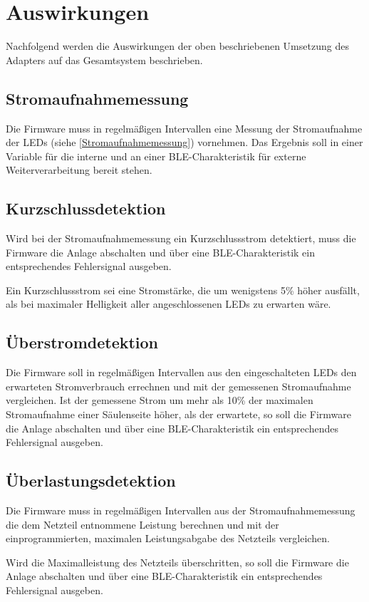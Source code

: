 
\section{Auswirkungen}

Nachfolgend werden die Auswirkungen der oben beschriebenen
Umsetzung des Adapters auf das Gesamtsystem beschrieben.

\subsection{Stromaufnahmemessung}

Die Firmware muss
in regelm\"a{\ss}igen Intervallen
eine Messung der
Stromaufnahme der LEDs
(siehe \ref{Stromaufnahmemessung})
vornehmen.
Das Ergebnis soll in einer Variable
f\"ur die interne
und an einer BLE-Charakteristik f\"ur externe
Weiterverarbeitung bereit stehen.

\subsection{Kurzschlussdetektion}

Wird bei der Stromaufnahmemessung
ein Kurzschlussstrom detektiert,
muss die Firmware die Anlage abschalten
und \"uber eine BLE-Charakteristik
ein entsprechendes Fehlersignal ausgeben.

Ein Kurzschlussstrom sei eine Stromst\"arke,
die um wenigstens 5\% h\"oher ausf\"allt,
als bei maximaler Helligkeit
aller angeschlossenen LEDs
zu erwarten w\"are.

\subsection{\"Uberstromdetektion}

Die Firmware soll
in regelm\"a{\ss}igen Intervallen
aus den eingeschalteten LEDs
den erwarteten Stromverbrauch errechnen
und mit der gemessenen Stromaufnahme vergleichen.
Ist der gemessene Strom
um mehr als 10\% der maximalen Stromaufnahme
einer S\"aulenseite
h\"oher,
als der erwartete,
so soll die Firmware die Anlage abschalten
und \"uber eine BLE-Charakteristik
ein entsprechendes Fehlersignal ausgeben.

\subsection{\"Uberlastungsdetektion}

Die Firmware muss
in regelm\"a{\ss}igen Intervallen
aus der Stromaufnahmemessung
die dem Netzteil entnommene Leistung berechnen
und mit der einprogrammierten,
maximalen Leistungsabgabe des Netzteils vergleichen.

Wird die Maximalleistung des Netzteils \"uberschritten,
so soll die Firmware die Anlage abschalten
und \"uber eine BLE-Charakteristik
ein entsprechendes Fehlersignal ausgeben.
